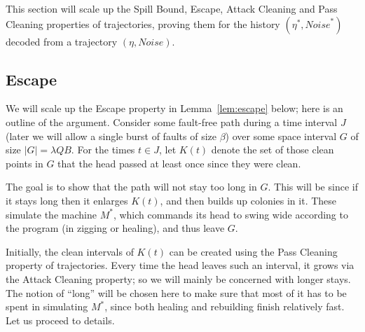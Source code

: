 \documentclass[11pt]{memoir}
\theoremstyle{definition} %
\newcommand{\fld}[1]{\ensuremath{\textit{#1\/}}}
\def\B{B}
\newcommand{\Noise}{\mathit{Noise}}
\newcommand{\Q}{Q} %
\newcommand{\Info}{\fld{Info}}
\begin{document}
This section will scale up the Spill Bound, Escape, Attack Cleaning
and Pass Cleaning properties of trajectories, proving them for the history \( (\eta^{*},\Noise^{*}) \)
decoded from a trajectory \( (\eta,\Noise) \).

\subsection{Escape}\label{sec:escape}

We will scale up the Escape property in Lemma~\ref{lem:escape} below;
here is an outline of the argument.
Consider some fault-free path during a time interval \( J \) (later we will allow a single
burst of faults of size \( \beta \))
over some space interval \( G \) of size \( |G|=\lambda\Q\B \).
For the times \( t\in J \), let \( K(t) \) denote the set of those clean points in \( G \) that
the head passed at least once since they were clean.

The goal is to show that the path will not stay too long in \( G \).
This will be since if it stays long then it enlarges \( K(t) \), and then builds up colonies in it.
These simulate the machine \( M^{*} \), which commands its head to swing wide according
to the program (in zigging or healing), and thus leave \( G \).

Initially, the clean intervals of \( K(t) \) can be created using the 
Pass Cleaning property of trajectories.
Every time the head leaves such an interval, it grows via the Attack Cleaning property;
so we will mainly be concerned with longer stays.
The notion of ``long'' will be chosen here to make sure that most of it has to be spent in
simulating \( M^{*} \), since both healing and rebuilding finish relatively fast.
Let us proceed to details.


\end{document}
